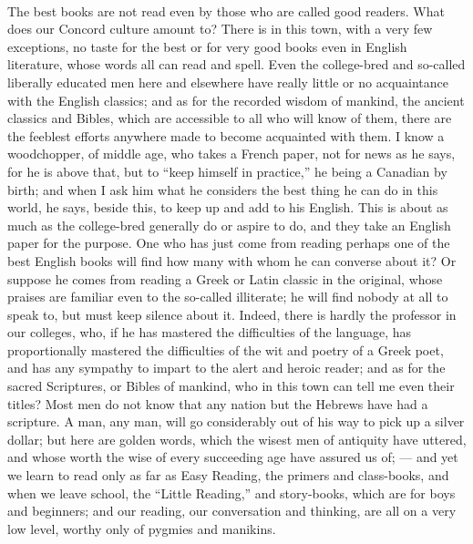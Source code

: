 \documentclass[letterpaper,12pt]{article}
\begin{document}
\paragraph{}
The best books are not read even by those who are called good readers. What does
our Concord culture amount to? There is in this town, with a very few
exceptions, no taste for the best or for very good books even in English
literature, whose words all can read and spell. Even the college-bred and
so-called liberally educated men here and elsewhere have really little or no
acquaintance with the English classics; and as for the recorded wisdom of
mankind, the ancient classics and Bibles, which are accessible to all who will
know of them, there are the feeblest efforts anywhere made to become acquainted
with them. I know a woodchopper, of middle age, who takes a French paper, not
for news as he says, for he is above that, but to \enquote{keep himself in
    practice,} he being a Canadian by birth; and when I ask him what he
considers the best thing he can do in this world, he says, beside this, to keep
up and add to his English. This is about as much as the college-bred generally
do or aspire to do, and they take an English paper for the purpose. One who has
just come from reading perhaps one of the best English books will find how many
with whom he can converse about it? Or suppose he comes from reading a Greek or
Latin classic in the original, whose praises are familiar even to the so-called
illiterate; he will find nobody at all to speak to, but must keep silence about
it. Indeed, there is hardly the professor in our colleges, who, if he has
mastered the difficulties of the language, has proportionally mastered the
difficulties of the wit and poetry of a Greek poet, and has any sympathy to
impart to the alert and heroic reader; and as for the sacred Scriptures, or
Bibles of mankind, who in this town can tell me even their titles? Most men do
not know that any nation but the Hebrews have had a scripture. A man, any man,
will go considerably out of his way to pick up a silver dollar; but here are
golden words, which the wisest men of antiquity have uttered, and whose worth
the wise of every succeeding age have assured us of; --- and yet we learn to
read only as far as Easy Reading, the primers and class-books, and when we leave
school, the \enquote{Little Reading,} and story-books, which are for boys and
beginners; and our reading, our conversation and thinking, are all on a very low
level, worthy only of pygmies and manikins.
\end{document}
